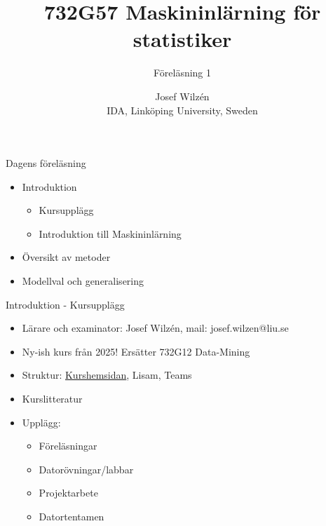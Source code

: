 \documentclass[10pt,english]{beamer}
\title{732G57 Maskininlärning för statistiker}
\subtitle{Föreläsning 1}
\date{}
\author{Josef Wilzén \\ IDA, Linköping University, Sweden}
\begin{document}
\maketitle

\begin{frame}{Dagens föreläsning}
    \begin{itemize}
        \item Introduktion
        \begin{itemize}
            \item Kursupplägg
            \item Introduktion till Maskininlärning
        \end{itemize}
        \item Översikt av metoder
        \item Modellval och generalisering
    \end{itemize}
\end{frame}

\begin{frame}{Introduktion - Kursupplägg}
    \begin{itemize}
        \item Lärare och examinator: Josef Wilzén, mail: josef.wilzen@liu.se
        \item Ny-ish kurs från 2025! Ersätter 732G12 Data-Mining
        \item Struktur:  \href{https://www.ida.liu.se/~732G57/info/courseinfo.sv.shtml}{Kurshemsidan}, Lisam, Teams
        \item Kurslitteratur
        \item Upplägg: 
        \begin{itemize}
            \item Föreläsningar
            \item Datorövningar/labbar
            \item Projektarbete
            \item Datortentamen
        \end{itemize}
    \end{itemize}
    
\end{frame}
\end{document}
